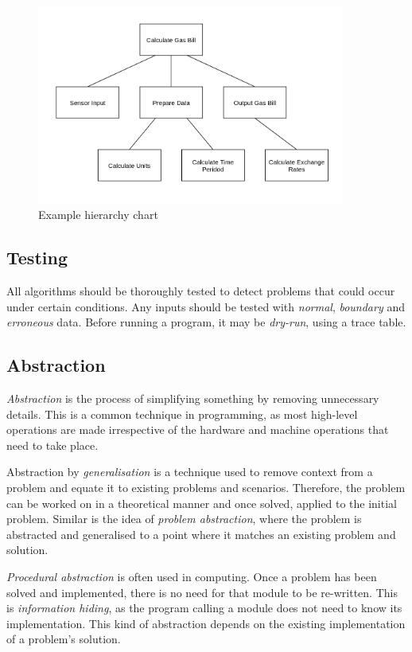\documentclass[9pt]{article}
\begin{document}
\begin{figure}[H]
\centering
\includegraphics[width=0.9\textwidth,keepaspectratio, frame]{./images/heirarchy.png}
\caption{Example hierarchy chart}
\end{figure}

\subsection{Testing}
\label{sec:org3cd2995}

All algorithms should be thoroughly tested to detect problems that could occur under certain conditions. Any inputs should be tested with \emph{normal}, \emph{boundary} and \emph{erroneous} data. Before running a program, it may be \emph{dry-run}, using a trace table.

\subsection{Abstraction}
\label{sec:orge729003}

\emph{Abstraction} is the process of simplifying something by removing unnecessary details. This is a common technique in programming, as most high-level operations are made irrespective of the hardware and machine operations that need to take place.

Abstraction by \emph{generalisation} is a technique used to remove context from a problem and equate it to existing problems and scenarios. Therefore, the problem can be worked on in a theoretical manner and once solved, applied to the initial problem. Similar is the idea of \emph{problem abstraction}, where the problem is abstracted and generalised to a point where it matches an existing problem and solution.

\emph{Procedural abstraction} is often used in computing. Once a problem has been solved and implemented, there is no need for that module to be re-written. This is \emph{information hiding}, as the program calling a module does not need to know its implementation. This kind of abstraction depends on the existing implementation of a problem's solution.
\end{document}
